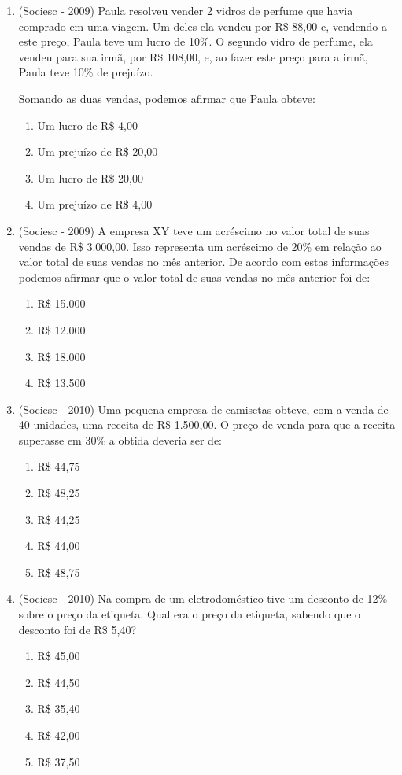 \begin{enumerate}
 \item (Sociesc - 2009) Paula resolveu vender 2 vidros de perfume que havia comprado em uma viagem. Um deles ela vendeu por R\$ 88,00 e, vendendo a este preço, Paula teve um lucro de 10\%. O segundo vidro de perfume, ela vendeu para sua irmã, por R\$ 108,00, e, ao fazer este preço para a irmã, Paula teve 10\% de prejuízo.
  
  Somando as duas vendas, podemos afirmar que Paula obteve:
  \begin{enumerate}
  \item Um lucro de R\$ 4,00
  \item Um prejuízo de R\$ 20,00
  \item Um lucro de R\$ 20,00
  \item Um prejuízo de R\$ 4,00
 \end{enumerate}
 
 \item (Sociesc - 2009) A empresa XY teve um acréscimo no valor total de suas vendas de R\$ 3.000,00. Isso representa um acréscimo de 20\% em relação ao valor total de suas vendas no mês anterior. De acordo com estas informações podemos afirmar que o valor total de suas vendas no mês anterior foi de:
  \begin{enumerate}
  \item R\$ 15.000
  \item R\$ 12.000
  \item R\$ 18.000
  \item R\$ 13.500
 \end{enumerate}
 
 \item (Sociesc - 2010) Uma pequena empresa de camisetas obteve, com a venda de 40 unidades, uma receita de R\$ 1.500,00. O preço de venda para que a receita superasse em 30\% a obtida deveria ser de:
  \begin{enumerate}
  \item R\$ 44,75
  \item R\$ 48,25
  \item R\$ 44,25
  \item R\$ 44,00
  \item R\$ 48,75
 \end{enumerate}
 
 \item (Sociesc - 2010) Na compra de um eletrodoméstico tive um desconto de 12\% sobre o preço da etiqueta. Qual era o preço da etiqueta, sabendo que o desconto foi de R\$ 5,40?
  \begin{enumerate}
  \item R\$ 45,00
  \item R\$ 44,50
  \item R\$ 35,40
  \item R\$ 42,00
  \item R\$ 37,50
 \end{enumerate}
 

\end{enumerate}

